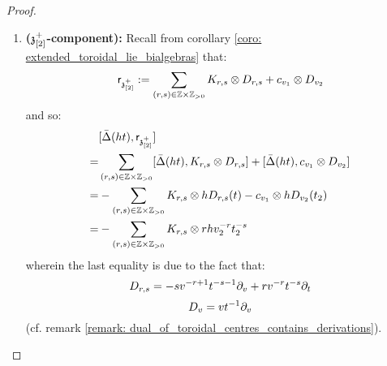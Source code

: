 \begin{proof}
\begin{enumerate}
\begin{enumerate}
                            \item \textbf{($\mathfrak{z}_{[2]}^+$-component):} Recall from corollary \ref{coro: extended_toroidal_lie_bialgebras} that:
                                $$\sfr_{\z_{[2]}^+} := \sum_{(r, s) \in \Z \x \Z_{> 0}} K_{r, s} \tensor D_{r, s} + c_{v_1} \tensor D_{v_2}$$
                            and so:
                                $$
                                    \begin{aligned}
                                        & [\bar{\Delta}(ht), \sfr_{\z_{[2]}^+}]
                                        \\
                                        = & \sum_{(r, s) \in \Z \x \Z_{> 0}} [\bar{\Delta}(ht), K_{r, s} \tensor D_{r, s}] + [\bar{\Delta}(ht), c_{v_1} \tensor D_{v_2}]
                                        \\
                                        = & -\sum_{(r, s) \in \Z \x \Z_{> 0}} K_{r, s} \tensor h D_{r, s}(t) - c_{v_1} \tensor h D_{v_2}(t_2)
                                        \\
                                        = & -\sum_{(r, s) \in \Z \x \Z_{> 0}} K_{r, s} \tensor r h v_2^{-r} t_2^{-s}
                                    \end{aligned}
                                $$
                            wherein the last equality is due to the fact that:
                                $$D_{r, s} = -s v^{-r + 1} t^{-s - 1} \partial_v + r v^{-r} t^{-s} \partial_t$$
                                $$D_v = v t^{-1} \partial_v$$
                            (cf. remark \ref{remark: dual_of_toroidal_centres_contains_derivations}). 
                            

\end{enumerate}
\end{enumerate}
\end{proof}
